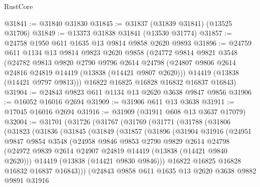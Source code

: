 \begin{lexlean}{RustCore}
\begin{coremodule}
@31841 := @31840 @31830
@31845 := @31837 (@31839 @31841) (@13525 @31706)
@31849 := @13373 @31838 @31841 (@13530 @31774)
@31857 := @24758 @1950 @611 @1635 @13 @9814 @9858 @2620 @9893
@31896 := @24759
    @611
    @1134
    @13
    @9814
    @9823
    @2620
    @9858
    (@24772
      @9814
      @9821
      @3548
      (@24782
        @9813
        @9820
        @2790
        @9796
        @2614
        @24798
        (@24807 @9806 @2614 @24816 @24819 @14419 (@13838 (@14421 @9807 @2620)))
        @14419
        (@13838 (@14421 @9797 @9813)))
      @16822
      @16825
      @16828
      @16832
      @16837
      @16843)
@31904 := @24843 @9823 @611 @1134 @13 @2620 @3638 @9847 @9856
@31906 := @16052 @16016 @2694
@31909 := @31906 @611 @13 @3638
@31911 := @17045 @16016 @2694
@31916 := @31909 (@31911 @608 @13 @3637 @17079)
@32004 := @31701
    (@31726
      (@31767
        (@31769
          (@31771
            (@31788
              (@31806
                (@31823
                  (@31836
                    (@31845
                      (@31849
                        (@31857
                          (@31896
                            (@31904
                              @31916
                              (@24951
                                @9847
                                @9854
                                @3548
                                (@24958
                                  @9846
                                  @9853
                                  @2790
                                  @9829
                                  @2614
                                  @24798
                                  (@24972
                                    @9839
                                    @2614
                                    @24907
                                    @24819
                                    @14419
                                    (@13838 (@14421 @9840 @2620)))
                                  @14419
                                  (@13838 (@14421 @9830 @9846)))
                                @16822
                                @16825
                                @16828
                                @16832
                                @16837
                                @16843)))
                          (@24843
                            @9858
                            @611
                            @1635
                            @13
                            @2620
                            @3638
                            @9882
                            @9891
                            @31916

\end{coremodule}
\end{lexlean}
